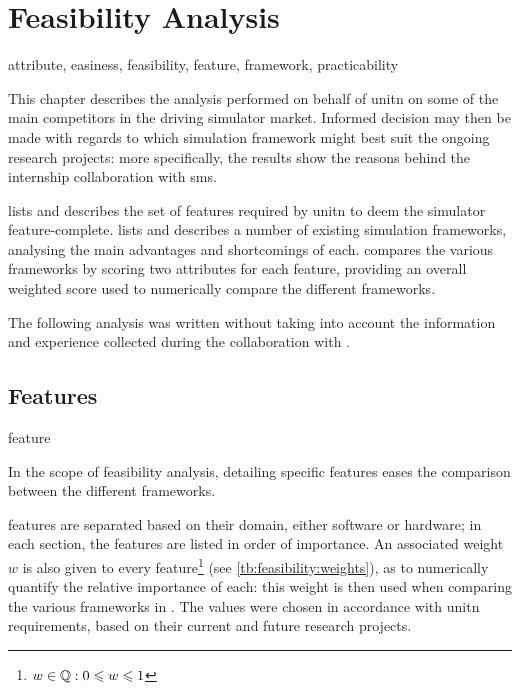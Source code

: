 \chapter{Feasibility Analysis}\label{ch:feasibility}

\begin{keywords}
	attribute, easiness, feasibility, feature, framework, practicability
\end{keywords}

This chapter describes the analysis performed on behalf of \gls{unitn} on some of the main competitors in the driving simulator market. Informed decision may then be made with regards to which simulation \gls{framework} might best suit the ongoing research projects: more specifically, the results show the reasons behind the internship collaboration with \gls{sms}.

 lists and describes the set of \glspl{feature} required by \gls{unitn} to deem the simulator feature-complete.  lists and describes a number of existing simulation \glspl{framework}, analysing the main advantages and shortcomings of each.  compares the various \glspl{framework} by scoring two \glspl{attribute} for each \gls{feature}, providing an overall weighted score used to numerically compare the different \glspl{framework}.

The following analysis was written without taking into account the information and experience collected during the collaboration with .

\section{Features}\label{sc:feasibility:features}

\begin{definition}{feature}
\end{definition}

In the scope of feasibility analysis, detailing specific \glspl{feature} eases the comparison between the different \glspl{framework}.

\Glspl{feature} are separated based on their domain, either software or hardware; in each section, the \glspl{feature} are listed in order of importance. An associated weight $w$ is also given to every \gls{feature}\footnote{$w \in \mathbb{Q}: 0 \leqslant w \leqslant 1$} (see \cref{tb:feasibility:weights}), as to numerically quantify the relative importance of each: this weight is then used when comparing the various \glspl{framework} in . The values were chosen in accordance with \gls{unitn} requirements, based on their current and future research projects.

